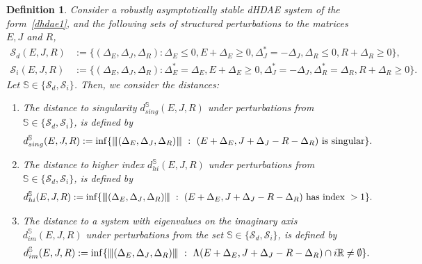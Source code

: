 \documentclass[10pt,a4paper]{amsart}
\newtheorem{definition}{Definition}
\newcommand{\nnrm}[1]{{\left\vert\kern-0.25ex\left\vert\kern-0.25ex\left\vert #1
		\right\vert\kern-0.25ex\right\vert\kern-0.25ex\right\vert}}
\begin{document}
\begin{definition}\label{def:distances}
	Consider a robustly  asymptotically stable dHDAE system of the form~\eqref{dhdae1}, and the following sets  of structured perturbations to the matrices $E, J$ and $R$,
	\begin{align}
		\mathcal S_d(E,J,R)&:= \{(\Delta_E,\Delta_J,\Delta_R):\Delta_E\leq 0, E+\Delta_E\geq 0, \Delta_J^*=-\Delta_J, \Delta_R\leq 0, R+\Delta_R\geq 0 \}, \label{set:Sd}\\
		\mathcal S_i(E,J,R)&:= \{(\Delta_E,\Delta_J,\Delta_R): \Delta_E^*=\Delta_E,E+\Delta_E\geq 0, \Delta_J^*=-\Delta_J, \Delta_R^*=\Delta_R, R+\Delta_R\geq 0 \}.\label{set:Si}
	\end{align}
	Let $\mathbb S\in \{\mathcal S_d,\mathcal S_i\}$. Then, we consider the  distances:
	\begin{enumerate}
		\item The distance to singularity $d_{sing}^{\mathbb S}(E,J,R)$ under perturbations from  $\mathbb S\in \{\mathcal S_d,\mathcal S_i\}$, is defined by
		\begin{equation}\label{def:dist-sing}
			d_{sing}^{\mathbb S}(E,J,R) := \inf\{\nnrm{(\Delta_E,\Delta_J,\Delta_R)}~:~(E+\Delta_E,J+\Delta_J-R-\Delta_R) \text{ is singular}\}.
		\end{equation}
		\item The distance to higher index $d_{hi}^{\mathbb S}(E,J,R)$ under perturbations from  $\mathbb S\in \{\mathcal S_d,\mathcal S_i\}$, is defined by
		\begin{equation}\label{def:dist-hi}
			d_{hi}^{\mathbb S}(E,J,R) := \inf\{\nnrm{(\Delta_E,\Delta_J,\Delta_R)}~:~(E+\Delta_E,J+\Delta_J-R-\Delta_R) \text{ has index }>1\}.
		\end{equation}
		\item The distance to a system with eigenvalues on the imaginary axis $d_{im}^{\mathbb S}(E,J,R)$ under perturbations from the set $\mathbb S\in \{\mathcal S_d,\mathcal S_i\}$, is defined by
		\begin{equation}\label{def:dist-im}
			d_{im}^{\mathbb S}(E,J,R) := \inf\{\nnrm{(\Delta_E,\Delta_J,\Delta_R)}~:~\Lambda(E+\Delta_E,J+\Delta_J-R-\Delta_R)\cap i\mathbb R \neq \emptyset \}.
		\end{equation}
	\end{enumerate}
\end{definition}
\end{document}
